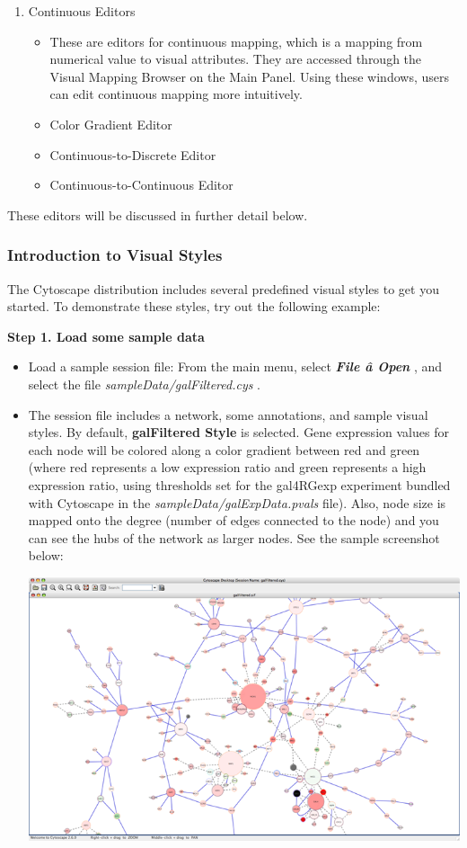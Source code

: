 \begin{enumerate}

\item Continuous Editors \begin{itemize}
\item These are editors for continuous mapping, which is a mapping from numerical value to visual attributes. They are accessed through the Visual Mapping Browser on the Main Panel. Using these windows, users can edit continuous mapping more intuitively. 
\item Color Gradient Editor 
\item Continuous-to-Discrete Editor 
\item Continuous-to-Continuous Editor 

\end{itemize}


\end{enumerate}


 These editors will be discussed in further detail below. 


 
\subsubsection*{Introduction to Visual Styles}


 The Cytoscape distribution includes several predefined visual styles to get you started. To demonstrate these styles, try out the following example: 


 \textbf{Step 1. Load some sample data}

\begin{itemize}
\item 

 Load a sample session file: From the main menu, select \emph{\textbf{File \^a Open}
}
, and select the file \emph{sampleData/galFiltered.cys}
. 

\item 

 The session file includes a network, some annotations, and sample visual styles. By default, \textbf{galFiltered Style}
 is selected. Gene expression values for each node will be colored along a color gradient between red and green (where red represents a low expression ratio and green represents a high expression ratio, using thresholds set for the gal4RGexp experiment bundled with Cytoscape in the \emph{sampleData/galExpData.pvals}
 file). Also, node size is mapped onto the degree (number of edges connected to the node) and you can see the hubs of the network as larger nodes. See the sample screenshot below: 


 \includegraphics[width=.6\textwidth]{images/galFilteredSessionDefault.png} 


\end{itemize}


